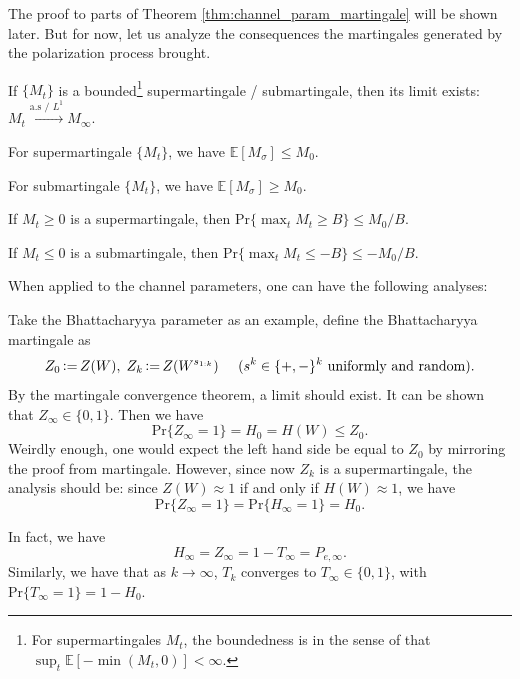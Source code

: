 The proof to parts of Theorem \autoref{thm:channel_param_martingale} will be shown later. But for now, let us analyze the consequences the martingales generated by the polarization process brought.
\begin{theorem}
    If $\{M_t\}$ is a bounded\footnote{For supermartingales $M_t$, the boundedness is in the sense of that $\sup_t \mathbb{E}[-\min(M_t,0)]<\infty$.} supermartingale / submartingale, then its limit exists: $M_t\xrightarrow{\text{a.s / $L^1$}}M_\infty$.
\end{theorem}
\begin{theorem}
    For supermartingale $\{M_t\}$, we have $\mathbb{E}[M_\sigma] \le M_0$.

    For submartingale $\{M_t\}$, we have $\mathbb{E}[M_\sigma] \ge M_0$.
\end{theorem}
\begin{theorem}
    If $M_t\ge 0$ is a supermartingale, then $\mathrm{Pr}\{\max_tM_t\ge B\} \le M_0/B$.

    If $M_t\le 0$ is a submartingale, then $\mathrm{Pr}\{\max_tM_t\le -B\} \le -M_0/B$.
\end{theorem}

When applied to the channel parameters, one can have the following analyses:
\begin{example}
    Take the Bhattacharyya parameter as an example, define the Bhattacharyya martingale as
    \begin{equation}
        Z_0\operatorname{\vcentcolon=} Z(W),\;Z_k\operatorname{\vcentcolon=} Z(W^{s_{1:k}})\;\;\;\;\;(s^k\in\{+,-\}^k \text{ uniformly and random}).
    \end{equation}
    By the martingale convergence theorem, a limit should exist. It can be shown that $Z_\infty\in\{0,1\}$. Then we have
    \begin{equation*}
        \mathrm{Pr}\{Z_\infty=1\} = H_0 = H(W) \le Z_0.
    \end{equation*}
    Weirdly enough, one would expect the left hand side be equal to $Z_0$ by mirroring the proof from martingale. However, since now $Z_k$ is a supermartingale, the analysis should be: since $Z(W)\approx1$ if and only if $H(W)\approx 1$, we have
    \begin{equation}
        \mathrm{Pr}\{Z_\infty=1\} = \mathrm{Pr}\{H_\infty=1\} = H_0.
    \end{equation}
\end{example}

In fact, we have
\begin{equation}
    H_\infty = Z_\infty = 1 - T_\infty = P_{e,\infty}.
\end{equation}
Similarly, we have that as $k\rightarrow\infty$, $T_k$ converges to $T_\infty\in\{0,1\}$, with $\mathrm{Pr}\{T_\infty=1\} = 1-H_0$.

